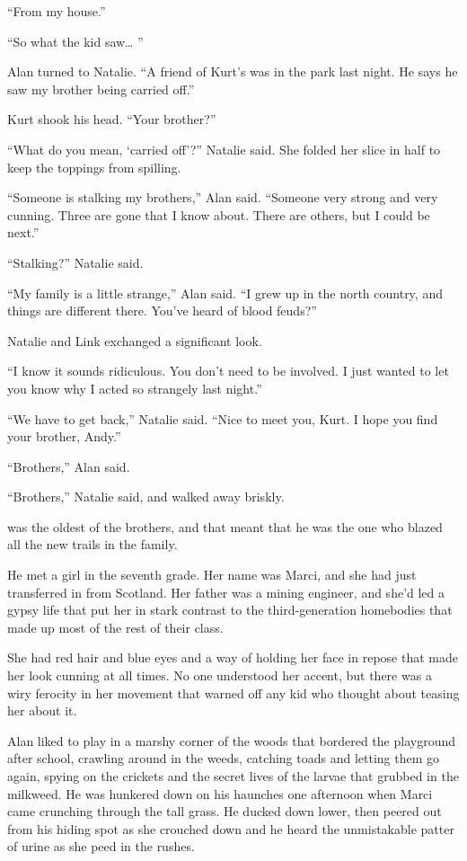 ``From my house.''

``So what the kid saw\ldots{}  ''

Alan turned to Natalie.  ``A friend of Kurt's was in the park last
night.  He says he saw my brother being carried off.''

Kurt shook his head.  ``Your brother?''

``What do you mean, `carried off'?'' Natalie said.  She folded her
slice in half to keep the toppings from spilling.

``Someone is stalking my brothers,'' Alan said.  ``Someone very strong
and very cunning.  Three are gone that I know about.  There are
others, but I could be next.''

``Stalking?'' Natalie said.

``My family is a little strange,'' Alan said.  ``I grew up in the
north country, and things are different there.  You've heard of blood
feuds?''

Natalie and Link exchanged a significant look.

``I know it sounds ridiculous.  You don't need to be involved.  I just
wanted to let you know why I acted so strangely last night.''

``We have to get back,'' Natalie said.  ``Nice to meet you, Kurt.  I
hope you find your brother, Andy.''

``Brothers,'' Alan said.

``Brothers,'' Natalie said, and walked away briskly.

 was the oldest of the brothers, and that meant that he was the
one who blazed all the new trails in the family.

He met a girl in the seventh grade.  Her name was Marci, and she had
just transferred in from Scotland.  Her father was a mining engineer,
and she'd led a gypsy life that put her in stark contrast to the
third-generation homebodies that made up most of the rest of their
class.

She had red hair and blue eyes and a way of holding her face in repose
that made her look cunning at all times.  No one understood her
accent, but there was a wiry ferocity in her movement that warned off
any kid who thought about teasing her about it.

Alan liked to play in a marshy corner of the woods that bordered the
playground after school, crawling around in the weeds, catching toads
and letting them go again, spying on the crickets and the secret lives
of the larvae that grubbed in the milkweed.  He was hunkered down on
his haunches one afternoon when Marci came crunching through the tall
grass.  He ducked down lower, then peered out from his hiding spot as
she crouched down and he heard the unmistakable patter of urine as she
peed in the rushes.

